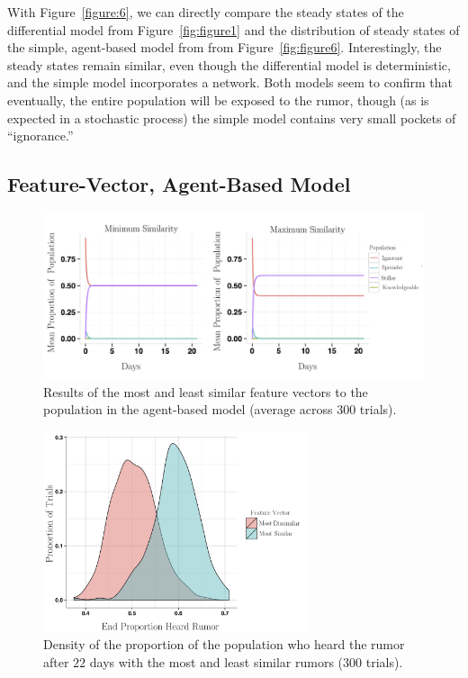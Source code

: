 With Figure~\ref{figure:6}, we can directly compare the steady states of the differential model from Figure~\ref{fig:figure1} and the distribution of steady states of the simple, agent-based model from from Figure~\ref{fig:figure6}.
Interestingly, the steady states remain similar, even though the differential model is deterministic, and the simple model incorporates a network.
Both models seem to confirm that eventually, the entire population will be exposed to the rumor, though (as is expected in a stochastic process) the simple model contains very small pockets of ``ignorance.''

\subsection{Feature-Vector, Agent-Based Model}
\label{subsec:featvect}

\begin{figure}[H]
\captionsetup{width=0.8\textwidth}
\centering
    \includegraphics[width=1\textwidth]{figures/figure7}
  \caption{ Results of the most and least similar feature vectors to the population in the agent-based model (average across $ 300 $ trials).}
\label{fig:figure7}
\end{figure}

\begin{figure}[H]
\captionsetup{width=0.8\textwidth}
\centering
    \includegraphics[width=0.7\textwidth]{figures/figure8}
  \caption{ Density of the proportion of the population who heard the rumor after $ 22 $ days with the most and least similar rumors ($ 300 $ trials).}
\label{fig:figure8}
\end{figure}

